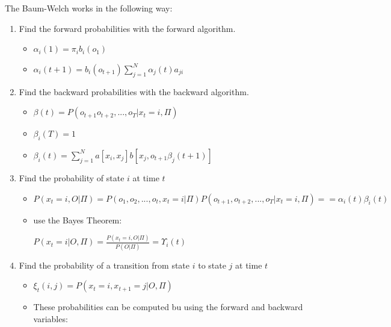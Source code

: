 The Baum-Welch works in the following way:

\begin{enumerate}


\item Find the forward probabilities with the forward algorithm.


\begin{itemize}
\item $\alpha_{i}(1) = \pi_{i} b_{i} (o_{1})$
\item $\alpha_{i}(t + 1) = b_{i}(o_{t+1}) \sum\limits^{N}_{j=1}\alpha_{j}(t)a_{ji}$

\end{itemize}

\item Find the backward probabilities with the backward algorithm.

\begin{itemize}
\item $\beta(t) = P(o_{t+1} o_{t+2},...,o_{T} | x_{t} = i, \Pi) $

\item $\beta_{i}(T) = 1$
\item $\beta_{i}(t) = \sum\limits^{N}_{j=1} a[x_i, x_j] b[x_j,o_{t + 1}\beta_{j}(t + 1)]$

\end{itemize}
\item Find the probability of state $i$ at time $t$

\begin{itemize}

\item $P (x_t = i, O | \Pi) = P (o_1, o_2,...,o_t, x_t = i | \Pi) P (o_{t + 1}, o_{t + 2},...,o_{T} | x_{t} = i, \Pi) == \alpha_{i}(t) \beta_{i}(t) $

\item use the Bayes Theorem:

$P(x_t = i | O, \Pi) = \frac{P(x_t = i, O | \Pi)}{P(O | \Pi)} = \Upsilon_{i}(t)$

\end{itemize}
\item Find the probability of a transition from state $i$ to state $j$ at time $t$

\begin{itemize}
\item $\xi_{t}(i,j) = P (x_t = i,x_{t + 1} = j | O, \Pi)$


\item These probabilities can be computed bu using the forward and backward variables:


\end{itemize}
\end{enumerate}
